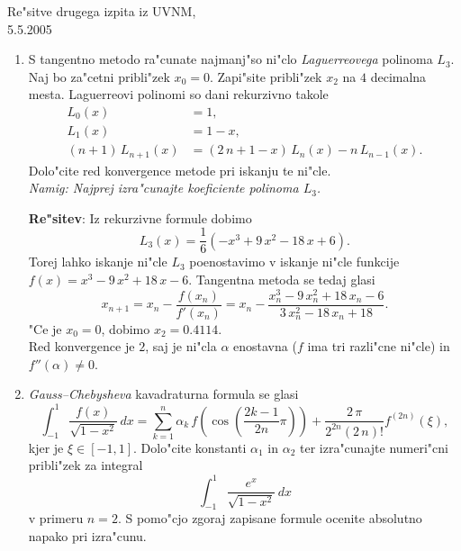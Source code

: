 \documentclass[12pt,a4paper]{article}
\begin{document}
\begin{center}
  {\large Re"sitve drugega izpita iz UVNM,\\
    5.5.2005\\
    }
\end{center}

\begin{enumerate}

  \item S tangentno metodo ra"cunate najmanj"so ni"clo
      {\sl Laguerreovega} polinoma $L_3$. Naj bo za"cetni pribli"zek
      $x_0=0$. Zapi"site pribli"zek $x_2$ na $4$ decimalna mesta.
      Laguerreovi polinomi so dani rekurzivno takole
      \begin{align*}
        L_0(x)&=1,\\
        L_1(x)&=1-x,\\
        (n+1)\,L_{n+1}(x)&=(2\,n+1-x)\,L_n(x)-n\,L_{n-1}(x).
      \end{align*}
      Dolo"cite red konvergence metode pri iskanju te ni"cle.\\
      {\sl Namig: Najprej izra"cunajte koeficiente polinoma $L_3$.}
  
   {\bf Re"sitev}: Iz rekurzivne formule dobimo
   $$L_3(x)=\frac{1}{6}(-x^3+9\,x^2-18\,x+6).$$
   Torej lahko iskanje ni"cle $L_3$ poenostavimo v iskanje ni"cle
   funkcije $f(x)=x^3-9\,x^2+18\,x-6$.
   Tangentna metoda se tedaj glasi
   $$x_{n+1}=x_n-\frac{f(x_n)}{f'(x_n)}=x_n-
   \frac{x_n^3-9\,x_n^2+18\,x_n-6}{3\,x_n^2-18\,x_n+18}.$$
   "Ce je $x_0=0$, dobimo $x_2=0.4114$.\\
   Red konvergence je $2$, saj je ni"cla $\alpha$ enostavna
   ($f$ ima tri razli"cne ni"cle) in $f''(\alpha)\neq 0$.
  
  \item {\sl Gauss--Chebysheva} kavadraturna formula
      se glasi
      $$\int_{-1}^{1}\frac{f(x)}{\sqrt{1-x^2}}\,dx=
        \sum_{k=1}^n \alpha_k\,f\left(\cos\left(\frac{2k-1}{2n}\pi\right)\right)+
        \frac{2\,\pi}{2^{2n}(2\,n)!}f^{(2n)}(\xi),$$ 
      kjer je $\xi\in[-1,1]$. 
      Dolo"cite konstanti $\alpha_1$ in $\alpha_2$ ter 
      izra"cunajte numeri"cni pribli"zek
      za integral
      $$\int_{-1}^{1}\frac{e^{x}}{\sqrt{1-x^2}}\,dx$$
      v primeru $n=2$. S pomo"cjo zgoraj zapisane formule
      ocenite absolutno napako pri izra"cunu.


\end{enumerate}
\end{document}
